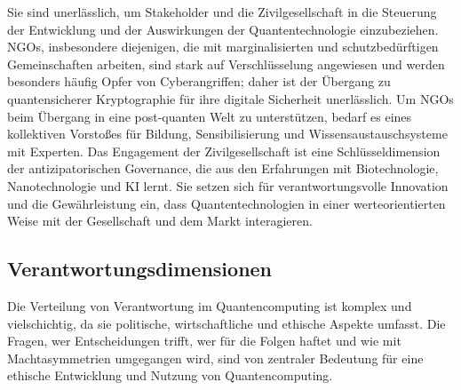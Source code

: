 Sie sind unerlässlich, um Stakeholder und die Zivilgesellschaft in die Steuerung der Entwicklung und der Auswirkungen der Quantentechnologie einzubeziehen. NGOs, insbesondere diejenigen, die mit marginalisierten und schutzbedürftigen Gemeinschaften arbeiten, sind stark auf Verschlüsselung angewiesen und werden besonders häufig Opfer von Cyberangriffen; daher ist der Übergang zu quantensicherer Kryptographie für ihre digitale Sicherheit unerlässlich. Um NGOs beim Übergang in eine post-quanten Welt zu unterstützen, bedarf es eines kollektiven Vorstoßes für Bildung, Sensibilisierung und Wissensaustauschsysteme mit Experten.\cite{gibson_futures_2024} Das Engagement der Zivilgesellschaft ist eine Schlüsseldimension der antizipatorischen Governance, die aus den Erfahrungen mit Biotechnologie, Nanotechnologie und KI lernt. Sie setzen sich für verantwortungsvolle Innovation und die Gewährleistung ein, dass Quantentechnologien in einer werteorientierten Weise mit der Gesellschaft und dem Markt interagieren.\cite{noauthor_pdf_2025}


\subsection{Verantwortungsdimensionen}
Die Verteilung von Verantwortung im Quantencomputing ist komplex und vielschichtig, da sie politische, wirtschaftliche und ethische Aspekte umfasst. Die Fragen, wer Entscheidungen trifft, wer für die Folgen haftet und wie mit Machtasymmetrien umgegangen wird, sind von zentraler Bedeutung für eine ethische Entwicklung und Nutzung von Quantencomputing.


